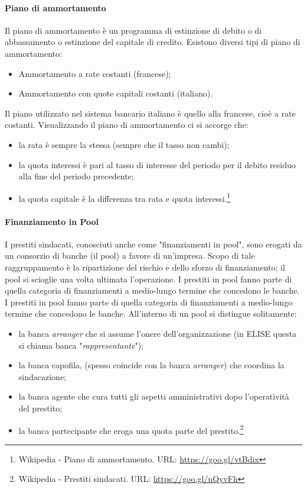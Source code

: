 \paragraph{Piano di ammortamento}
Il piano di ammortamento è un programma di estinzione di debito o di abbassamento o estinzione del capitale di credito. Esistono diversi tipi di piano di ammortamento:
	\begin{itemize}
		\item Ammortamento a rate costanti (francese);
		\item Ammortamento con quote capitali costanti (italiano).	
	\end{itemize}
Il piano utilizzato nel sistema bancario italiano è quello alla francese, cioè a rate costanti. Visualizzando il piano di ammortamento ci si accorge che:
	\begin{itemize}
		\item la rata è sempre la stessa (sempre che il tasso non cambi);
		\item la quota interessi è pari al tasso di interesse del periodo per il debito residuo alla fine del periodo precedente;
		\item la quota capitale è la differenza tra rata e quota interessi.\footnote{Wikipedia - Piano di ammortamento. URL: \url{https://goo.gl/vtBdix}}
	\end{itemize}

\paragraph{Finanziamento in Pool}
I prestiti sindacati, conosciuti anche come "finanziamenti in pool", sono erogati da un consorzio di banche (il pool) a favore di un'impresa. Scopo di tale raggruppamento è la ripartizione del rischio e dello sforzo di finanziamento; il pool si scioglie una volta ultimata l'operazione. I prestiti in pool fanno parte di quella categoria di finanziamenti a medio-lungo termine che concedono le banche. I prestiti in pool fanno parte di quella categoria di finanziamenti a medio-lungo termine che concedono le banche. All'interno di un pool si distingue solitamente:
	\begin{itemize}
		\item la banca \textit{arranger} che si assume l'onere dell'organizzazione (in ELISE questa si chiama banca "\textit{rappresentante}");
		\item la banca capofila, (spesso coincide con la banca \textit{arranger}) che coordina la sindacazione;
		\item la banca agente che cura tutti gli aspetti amministrativi dopo l'operatività del prestito;
		\item la banca partecipante che eroga una quota parte del prestito.\footnote{Wikipedia - Prestiti sindacati. URL: \url{https://goo.gl/nQyvFh}}
	\end{itemize}

